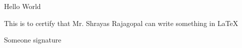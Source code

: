 \documentclass{article}
\begin{document}
\begin{center}
Hello World
\end{center}
\noindent This is to certify that Mr. Shrayas Rajagopal can write something in \LaTeX
\begin{flushright}
Someone signature
\end{flushright}
\end{document}

